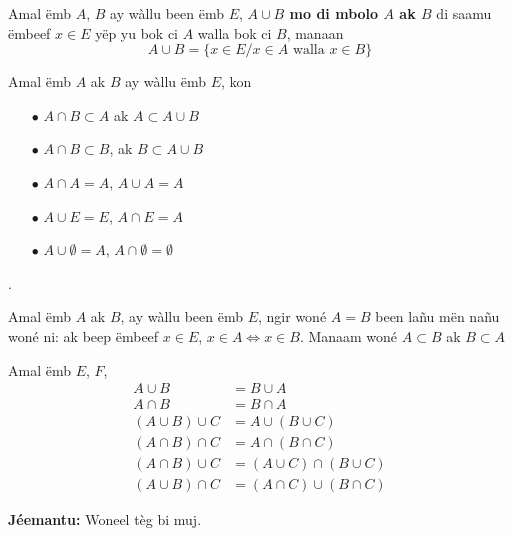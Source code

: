 \documentclass[twoside, a4paper]{article}
\begin{document}
\begin{tcolorbox}[enhanced jigsaw,breakable,pad at break*=1mm, colback=red!5!white,colframe=white!75!black,title= Téeki,watermark color=white]
Amal ëmb $A$, $B$ ay wàllu been ëmb $E$, \textbf{$A\cup B$ mo di mbolo $A$ ak $B$} di saamu ëmbeef $x\in E$ yëp yu bok ci $A$ walla bok ci $B$, manaan $$A\cup B = \big\{x \in E/ x \in A \text{ walla } x \in B\big\}$$
\end{tcolorbox}
\begin{tcolorbox}[enhanced jigsaw,breakable,pad at break*=1mm, colback=orange!5!white,colframe=white!75!black,title= Seetlu,
  watermark color=white]
Amal ëmb $A$ ak $B$ ay wàllu ëmb $E$, kon 
\begin{itemize}
    \item[$\bullet$] $A\cap B \subset A$ ak $A \subset A \cup B$
    \item[$\bullet$] $A\cap B \subset B$, ak $ B\subset A \cup B$
    \item[$\bullet$] $A\cap A=A$, $A\cup A = A$
    \item[$\bullet$] $A\cup E = E$, $A\cap E = A$
    \item[$\bullet$] $A\cup \emptyset = A$, $A\cap \emptyset = \emptyset$
\end{itemize}.  
    
\end{tcolorbox}


\begin{tcolorbox}[enhanced jigsaw,breakable,pad at break*=1mm, colback=green!5!white,colframe=white!75!black,title= Tègtal\footnote{Indication ?},
  watermark color=white]
Amal ëmb $A$ ak $B$, ay wàllu been ëmb $E$, ngir woné $A=B$ been lañu mën nañu woné ni: ak beep ëmbeef $x\in E$, $x\in A \iff x \in B$. Manaam woné $A \subset B$ ak $B \subset A$
\end{tcolorbox}

\begin{tcolorbox}[enhanced jigsaw,breakable,pad at break*=1mm, colback=blue!5!white,colframe=white!75!black,title= Tèg\footnote{Proposition},
  watermark color=white]
Amal ëmb $E$, $F$, 
\begin{align*}
    A \cup B &= B \cup A \\
    A \cap B &= B \cap A \\
    (A \cup B) \cup C &= A \cup (B \cup C) \\
    (A \cap B) \cap C &= A \cap (B \cap C) \\
    (A \cap B) \cup C &= (A \cup C) \cap (B \cup C) \\
    (A \cup B) \cap C &= (A \cap C) \cup (B \cap C) 
\end{align*}
\end{tcolorbox}
\textbf{Jéemantu:} Woneel tèg bi muj.
\end{document}

